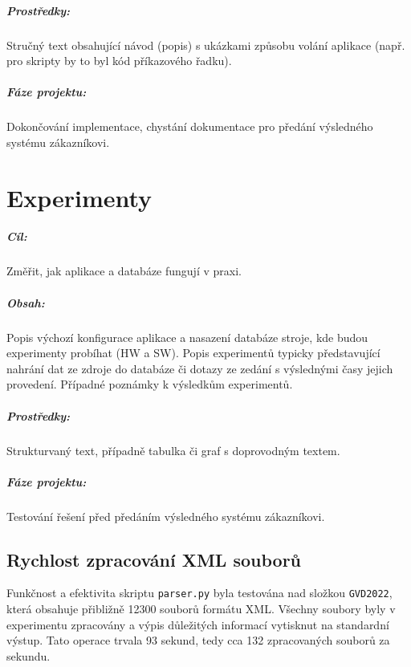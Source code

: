 \documentclass[10pt,xcolor=pdflatex,dvipsnames,table,oneside]{book}
\begin{document}
\paragraph{Prostředky:}
Stručný text obsahující návod (popis) s ukázkami způsobu volání aplikace (např. pro skripty by to byl kód příkazového řadku).

\paragraph{Fáze projektu:}
Dokončování implementace, chystání dokumentace pro předání výsledného systému zákazníkovi.

\chapter{Experimenty}

\paragraph{Cíl:}
Změřit, jak aplikace a databáze fungují v praxi.

\paragraph{Obsah:}
Popis výchozí konfigurace aplikace a nasazení databáze stroje, kde budou experimenty probíhat (HW a SW).
Popis experimentů typicky představující nahrání dat ze zdroje do databáze či dotazy ze zedání s výslednými časy jejich provedení.
Případné poznámky k výsledkům experimentů.

\paragraph{Prostředky:}
Strukturvaný text, případně tabulka či graf s doprovodným textem.

\paragraph{Fáze projektu:}
Testování řešení před předáním výsledného systému zákazníkovi.

\section{Rychlost zpracování XML souborů}
Funkčnost a efektivita skriptu \verb|parser.py| byla testována nad složkou \verb|GVD2022|, která obsahuje přibližně 12300 souborů formátu XML. Všechny soubory byly v experimentu zpracovány a výpis důležitých informací vytisknut na standardní výstup. Tato operace trvala 93 sekund, tedy cca 132 zpracovaných souborů za sekundu.
\end{document}
